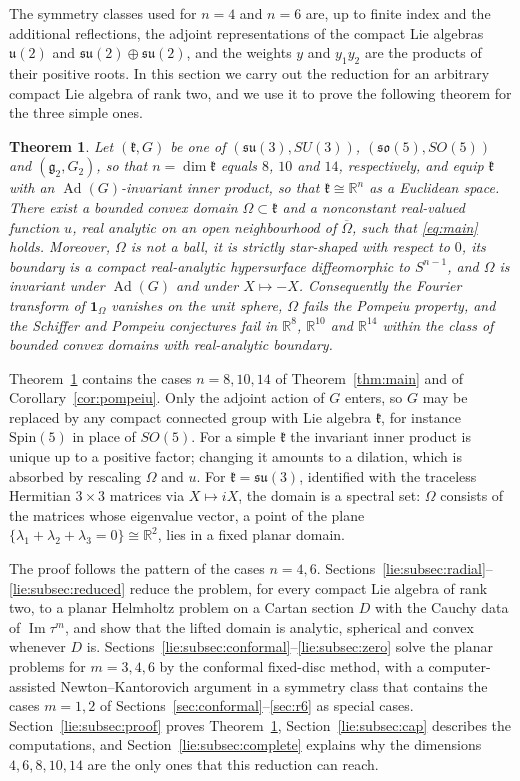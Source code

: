 \documentclass[11pt]{amsart}
\newtheorem{theorem}{Theorem}[section]
\theoremstyle{definition}
\theoremstyle{remark}
\numberwithin{equation}{section}
\newcommand{\R}{\mathbb{R}}
\newcommand{\one}{\mathbf{1}}
\DeclareMathOperator{\im}{Im}
\newcommand{\Ad}{\operatorname{Ad}}
\newcommand{\kf}{\mathfrak{k}}
\begin{document}
The symmetry classes used for $n=4$ and $n=6$ are, up to finite index and the additional reflections, the adjoint representations of the compact Lie algebras $\mathfrak u(2)$ and $\mathfrak{su}(2)\oplus\mathfrak{su}(2)$, and the weights $y$ and $y_1y_2$ are the products of their positive roots. In this section we carry out the reduction for an arbitrary compact Lie algebra of rank two, and we use it to prove the following theorem for the three simple ones.

\begin{theorem}\label{lie:thm}
Let $(\kf,G)$ be one of $(\mathfrak{su}(3),SU(3))$, $(\mathfrak{so}(5),SO(5))$ and $(\mathfrak g_2,G_2)$, so that $n=\dim\kf$ equals $8$, $10$ and $14$, respectively, and equip $\kf$ with an $\Ad(G)$-invariant inner product, so that $\kf\cong\R^n$ as a Euclidean space. There exist a bounded convex domain $\Omega\subset\kf$ and a nonconstant real-valued function $u$, real analytic on an open neighbourhood of $\overline\Omega$, such that \eqref{eq:main} holds. Moreover, $\Omega$ is not a ball, it is strictly star-shaped with respect to $0$, its boundary is a compact real-analytic hypersurface diffeomorphic to $S^{n-1}$, and $\Omega$ is invariant under $\Ad(G)$ and under $X\mapsto-X$. Consequently the Fourier transform of $\one_\Omega$ vanishes on the unit sphere, $\Omega$ fails the Pompeiu property, and the Schiffer and Pompeiu conjectures fail in $\R^8$, $\R^{10}$ and $\R^{14}$ within the class of bounded convex domains with real-analytic boundary.
\end{theorem}

Theorem~\ref{lie:thm} contains the cases $n=8,10,14$ of Theorem~\ref{thm:main} and of Corollary~\ref{cor:pompeiu}. Only the adjoint action of $G$ enters, so $G$ may be replaced by any compact connected group with Lie algebra $\kf$, for instance $\mathrm{Spin}(5)$ in place of $SO(5)$. For a simple $\kf$ the invariant inner product is unique up to a positive factor; changing it amounts to a dilation, which is absorbed by rescaling $\Omega$ and $u$. For $\kf=\mathfrak{su}(3)$, identified with the traceless Hermitian $3\times3$ matrices via $X\mapsto iX$, the domain is a spectral set: $\Omega$ consists of the matrices whose eigenvalue vector, a point of the plane $\{\lambda_1+\lambda_2+\lambda_3=0\}\cong\R^2$, lies in a fixed planar domain.

The proof follows the pattern of the cases $n=4,6$. Sections~\ref{lie:subsec:radial}--\ref{lie:subsec:reduced} reduce the problem, for every compact Lie algebra of rank two, to a planar Helmholtz problem on a Cartan section $D$ with the Cauchy data of $\im\tau^m$, and show that the lifted domain is analytic, spherical and convex whenever $D$ is. Sections~\ref{lie:subsec:conformal}--\ref{lie:subsec:zero} solve the planar problems for $m=3,4,6$ by the conformal fixed-disc method, with a computer-assisted Newton--Kantorovich argument in a symmetry class that contains the cases $m=1,2$ of Sections~\ref{sec:conformal}--\ref{sec:r6} as special cases. Section~\ref{lie:subsec:proof} proves Theorem~\ref{lie:thm}, Section~\ref{lie:subsec:cap} describes the computations, and Section~\ref{lie:subsec:complete} explains why the dimensions $4,6,8,10,14$ are the only ones that this reduction can reach.
\end{document}
